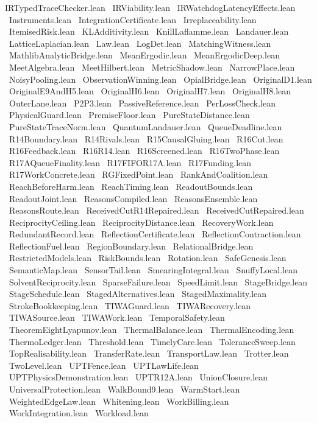 IRTypedTraceChecker.lean \
IRViability.lean \
IRWatchdogLatencyEffects.lean \
Instruments.lean \
IntegrationCertificate.lean \
Irreplaceability.lean \
ItemisedRisk.lean \
KLAdditivity.lean \
KnillLaflamme.lean \
Landauer.lean \
LatticeLaplacian.lean \
Law.lean \
LogDet.lean \
MatchingWitness.lean \
MathlibAnalyticBridge.lean \
MeanErgodic.lean \
MeanErgodicDeep.lean \
MeetAlgebra.lean \
MeetHilbert.lean \
MetricShadow.lean \
NarrowPlace.lean \
NoisyPooling.lean \
ObservationWinning.lean \
OpialBridge.lean \
OriginalD1.lean \
OriginalE9AndH5.lean \
OriginalH6.lean \
OriginalH7.lean \
OriginalH8.lean \
OuterLane.lean \
P2P3.lean \
PassiveReference.lean \
PerLossCheck.lean \
PhysicalGuard.lean \
PremiseFloor.lean \
PureStateDistance.lean \
PureStateTraceNorm.lean \
QuantumLandauer.lean \
QueueDeadline.lean \
R14Boundary.lean \
R14Rivals.lean \
R15CausalGluing.lean \
R16Cut.lean \
R16Feedback.lean \
R16R14.lean \
R16Screened.lean \
R16TwoPhase.lean \
R17AQueueFinality.lean \
R17FIFOR17A.lean \
R17Funding.lean \
R17WorkConcrete.lean \
RGFixedPoint.lean \
RankAndCoalition.lean \
ReachBeforeHarm.lean \
ReachTiming.lean \
ReadoutBounds.lean \
ReadoutJoint.lean \
ReasonsCompiled.lean \
ReasonsEnsemble.lean \
ReasonsRoute.lean \
ReceivedCutR14Repaired.lean \
ReceivedCutRepaired.lean \
ReciprocityCeiling.lean \
ReciprocityDistance.lean \
RecoveryWork.lean \
RedundantRecord.lean \
ReflectionCertificate.lean \
ReflectionContraction.lean \
ReflectionFuel.lean \
RegionBoundary.lean \
RelationalBridge.lean \
RestrictedModels.lean \
RiskBounds.lean \
Rotation.lean \
SafeGenesis.lean \
SemanticMap.lean \
SensorTail.lean \
SmearingIntegral.lean \
SnuffyLocal.lean \
SolventReciprocity.lean \
SparseFailure.lean \
SpeedLimit.lean \
StageBridge.lean \
StageSchedule.lean \
StagedAlternatives.lean \
StagedMaximality.lean \
StrokeBookkeeping.lean \
TIWAGuard.lean \
TIWARecovery.lean \
TIWASource.lean \
TIWAWork.lean \
TemporalSafety.lean \
TheoremEightLyapunov.lean \
ThermalBalance.lean \
ThermalEncoding.lean \
ThermoLedger.lean \
Threshold.lean \
TimelyCare.lean \
ToleranceSweep.lean \
TopRealisability.lean \
TransferRate.lean \
TransportLaw.lean \
Trotter.lean \
TwoLevel.lean \
UPTFence.lean \
UPTLawLife.lean \
UPTPhysicsDemonstration.lean \
UPTR12A.lean \
UnionClosure.lean \
UniversalProtection.lean \
WalkBound9.lean \
WarmStart.lean \
WeightedEdgeLaw.lean \
Whitening.lean \
WorkBilling.lean \
WorkIntegration.lean \
Workload.lean \
